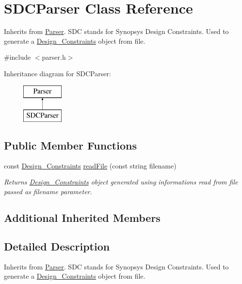 \hypertarget{classSDCParser}{\section{S\-D\-C\-Parser Class Reference}
\label{classSDCParser}
}


Inherits from \hyperlink{classParser}{Parser}. S\-D\-C stands for Synopsys Design Constraints. Used to generate a \hyperlink{classDesign__Constraints}{Design\-\_\-\-Constraints} object from file.  




{\ttfamily \#include $<$parser.\-h$>$}

Inheritance diagram for S\-D\-C\-Parser\-:\begin{figure}[H]
\begin{center}
\leavevmode
\includegraphics[height=2.000000cm]{classSDCParser}
\end{center}
\end{figure}
\subsection*{Public Member Functions}
\begin{DoxyCompactItemize}
\item 
const \hyperlink{classDesign__Constraints}{Design\-\_\-\-Constraints} \hyperlink{classSDCParser_afc0ae26ac89138dd7b84e2986375785f}{read\-File} (const string filename)
\begin{DoxyCompactList}\small\item\em Returns \hyperlink{classDesign__Constraints}{Design\-\_\-\-Constraints} object generated using informations read from file passed as filename parameter. \end{DoxyCompactList}\end{DoxyCompactItemize}
\subsection*{Additional Inherited Members}


\subsection{Detailed Description}
Inherits from \hyperlink{classParser}{Parser}. S\-D\-C stands for Synopsys Design Constraints. Used to generate a \hyperlink{classDesign__Constraints}{Design\-\_\-\-Constraints} object from file. 

